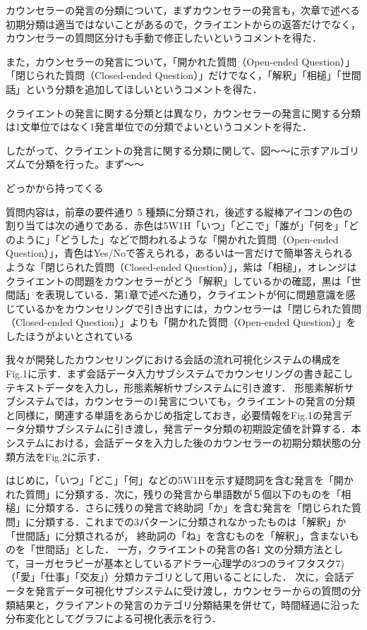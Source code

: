 \documentclass[shuuron]{kuee}
\begin{document}
カウンセラーの発言の分類について，まずカウンセラーの発言も，次章で述べる初期分類は適当ではないことがあるので，クライエントからの返答だけでなく，カウンセラーの質問区分けも手動で修正したいというコメントを得た．

また，カウンセラーの発言について，「開かれた質問（Open-ended Question）」「閉じられた質問（Closed-ended Question）」だけでなく，「解釈」「相槌」「世間話」という分類を追加してほしいというコメントを得た．

クライエントの発言に関する分類とは異なり，カウンセラーの発言に関する分類は1文単位ではなく1発言単位での分類でよいというコメントを得た．

したがって、クライエントの発言に関する分類に関して、図〜〜に示すアルゴリズムで分類を行った。まず〜〜

どっかから持ってくる


質問内容は，前章の要件通り 5 種類に分類され，後述する縦棒アイコンの色の割り当ては次の通りである．赤色は5W1H「いつ」「どこで」「誰が」「何を」「どのように」「どうした」などで問われるような「開かれた質問（Open-ended Question）」，青色はYes/Noで答えられる，あるいは一言だけで簡単答えられるような「閉じられた質問（Closed-ended Question）」，紫は「相槌」，オレンジはクライエントの問題をカウンセラーがどう「解釈」しているかの確認，黒は「世間話」を表現している．第1章で述べた通り，クライエントが何に問題意識を感じているかをカウンセリングで引き出すには，カウンセラーは「閉じられた質問（Closed-ended Question）」よりも「開かれた質問（Open-ended Question）」をしたほうがよいとされている

我々\cite{uetsuji}が開発したカウンセリングにおける会話の流れ可視化システムの構成をFig.1に示す．まず会話データ入力サブシステムでカウンセリングの書き起こしテキストデータを入力し，形態素解析サブシステムに引き渡す．
形態素解析サブシステムでは，カウンセラーの1発言についても，クライエントの発言の分類と同様に，関連する単語をあらかじめ指定しておき，必要情報をFig.1の発言データ分類サブシステムに引き渡し，発言データ分類の初期設定値を計算する．本システムにおける，会話データを入力した後のカウンセラーの初期分類状態の分類方法をFig.2に示す．

はじめに，「いつ」「どこ」「何」などの5W1Hを示す疑問詞を含む発言を「開かれた質問」に分類する．次に，残りの発言から単語数が５個以下のものを「相槌」に分類する．さらに残りの発言で終助詞「か」を含む発言を「閉じられた質問」に分類する．これまでの3パターンに分類されなかったものは「解釈」か「世間話」に分類されるが，
終助詞の「ね」を含むものを「解釈」，含まないものを「世間話」とした．
一方，クライエントの発言の各1 文の分類方法として，ヨーガセラピーが基本としているアドラー心理学の3つのライフタスク7)（「愛」「仕事」「交友」）分類カテゴリとして用いることにした．
次に，会話データを発言データ可視化サブシステムに受け渡し，カウンセラーからの質問の分類結果と，クライアントの発言のカテゴリ分類結果を併せて，時間経過に沿った分布変化としてグラフによる可視化表示を行う．
\end{document}
